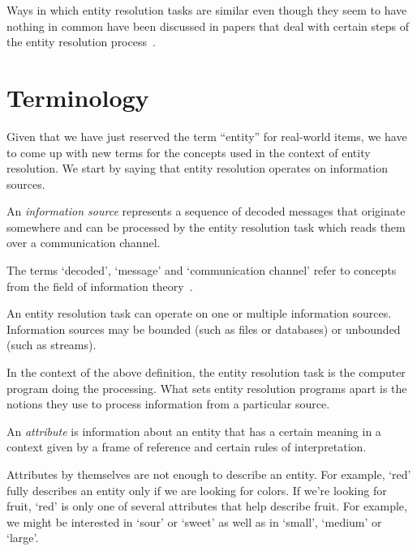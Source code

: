 \documentclass[lettersize,journal]{IEEEtran}
\begin{document}
    Ways in which entity resolution tasks are similar even though they seem
    to have nothing in common have been discussed in papers that deal with
    certain steps of the entity resolution process~\cite{Pap19,Chen09}.

    \section{Terminology}\label{sec:terminology}

    Given that we have just reserved the term ``entity'' for real-world items,
    we have to come up with new terms for the concepts used in the context of
    entity resolution.
    We start by saying that entity resolution operates on information sources.

    \begin{defn}
        An \textit{information source} represents a sequence of decoded messages
        that originate somewhere and can be processed by the entity resolution
        task which reads them over a communication channel.
    \end{defn}

    The terms `decoded', `message' and `communication channel' refer to concepts
    from the field of information theory~\cite{ash2012it}.
    
    An entity resolution task can operate on one or multiple information
    sources.
    Information sources may be bounded (such as files or databases) or unbounded
    (such as streams).
    
    In the context of the above definition, the entity resolution task is the
    computer program doing the processing.
    What sets entity resolution programs apart is the notions they use to
    process information from a particular source.

    \begin{defn}
        An \textit{attribute} is information about an entity that has a certain
        meaning in a context given by a frame of reference and certain rules of
        interpretation.
    \end{defn}

    Attributes by themselves are not enough to describe an entity.
    For example, `red' fully describes an entity only if we are looking for
    colors.
    If we're looking for fruit, `red' is only one of several attributes that
    help describe fruit.
    For example, we might be interested in `sour' or `sweet' as well as in
    `small', `medium' or `large'.
\end{document}
